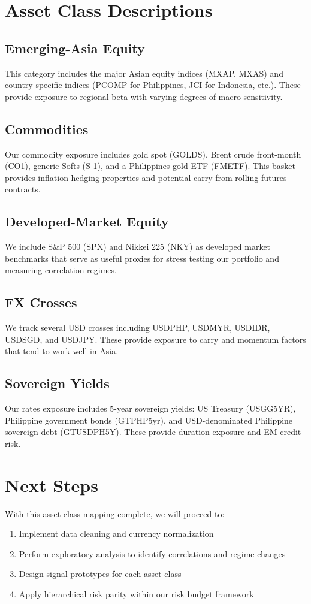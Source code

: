 \documentclass{article}
\begin{document}
\section{Asset Class Descriptions}

\subsection{Emerging-Asia Equity}
This category includes the major Asian equity indices (MXAP, MXAS) and country-specific indices 
(PCOMP for Philippines, JCI for Indonesia, etc.). These provide exposure to regional beta with 
varying degrees of macro sensitivity.

\subsection{Commodities}
Our commodity exposure includes gold spot (GOLDS), Brent crude front-month (CO1), generic Softs (S 1), 
and a Philippines gold ETF (FMETF). This basket provides inflation hedging properties and potential
carry from rolling futures contracts.

\subsection{Developed-Market Equity}
We include S\&P 500 (SPX) and Nikkei 225 (NKY) as developed market benchmarks that serve as 
useful proxies for stress testing our portfolio and measuring correlation regimes.

\subsection{FX Crosses}
We track several USD crosses including USDPHP, USDMYR, USDIDR, USDSGD, and USDJPY. 
These provide exposure to carry and momentum factors that tend to work well in Asia.

\subsection{Sovereign Yields}
Our rates exposure includes 5-year sovereign yields: US Treasury (USGG5YR), Philippine government bonds (GTPHP5yr), 
and USD-denominated Philippine sovereign debt (GTUSDPH5Y). These provide duration exposure and EM credit risk.

\section{Next Steps}

With this asset class mapping complete, we will proceed to:

\begin{enumerate}
    \item Implement data cleaning and currency normalization
    \item Perform exploratory analysis to identify correlations and regime changes
    \item Design signal prototypes for each asset class
    \item Apply hierarchical risk parity within our risk budget framework
\end{enumerate}
\end{document}
